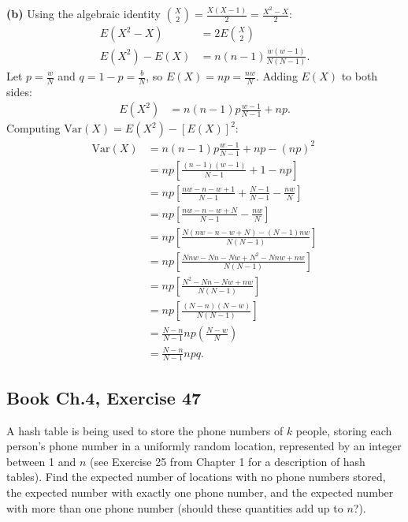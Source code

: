 \documentclass[11pt,a4paper]{article}
\begin{document}
\vspace{4pt}
\noindent \textbf{(b)} Using the algebraic identity $\binom{X}{2} = \frac{X(X-1)}{2} = \frac{X^2 - X}{2}$:
\begin{align*}
E\left(X^2 - X\right) &= 2 E\binom{X}{2} \\
E(X^2) - E(X) &= n(n-1) \frac{w(w-1)}{N(N-1)}.
\end{align*}
Let $p = \frac{w}{N}$ and $q = 1 - p = \frac{b}{N}$, so $E(X) = n p = \frac{n w}{N}$. Adding $E(X)$ to both sides:
\begin{align*}
E(X^2) &= n(n-1) p \frac{w-1}{N-1} + n p.
\end{align*}
Computing $\text{Var}(X) = E(X^2) - [E(X)]^2$:
\begin{align*}
\text{Var}(X) &= n(n-1) p \frac{w-1}{N-1} + n p - (n p)^2 \\
&= n p \left[ \frac{(n-1)(w-1)}{N-1} + 1 - n p \right] \\
&= n p \left[ \frac{n w - n - w + 1}{N-1} + \frac{N - 1}{N-1} - \frac{n w}{N} \right] \\
&= n p \left[ \frac{n w - n - w + N}{N-1} - \frac{n w}{N} \right] \\
&= n p \left[ \frac{N(n w - n - w + N) - (N-1)n w}{N(N-1)} \right] \\
&= n p \left[ \frac{N n w - N n - N w + N^2 - N n w + n w}{N(N-1)} \right] \\
&= n p \left[ \frac{N^2 - N n - N w + n w}{N(N-1)} \right] \\
&= n p \left[ \frac{(N - n)(N - w)}{N(N-1)} \right] \\
&= \frac{N - n}{N - 1} n p \left(\frac{N - w}{N}\right) \\
&= \frac{N - n}{N - 1} n p q.
\end{align*}

\vspace{10pt}
\subsection{Book Ch.4, Exercise 47}
\begin{tcolorbox}[title={Book Ch.4, Exercise 47}]
A hash table is being used to store the phone numbers of $k$ people, storing each person's phone number in a uniformly random location, represented by an integer between 1 and $n$ (see Exercise 25 from Chapter 1 for a description of hash tables). Find the expected number of locations with no phone numbers stored, the expected number with exactly one phone number, and the expected number with more than one phone number (should these quantities add up to $n$?).
\end{tcolorbox}
\end{document}

